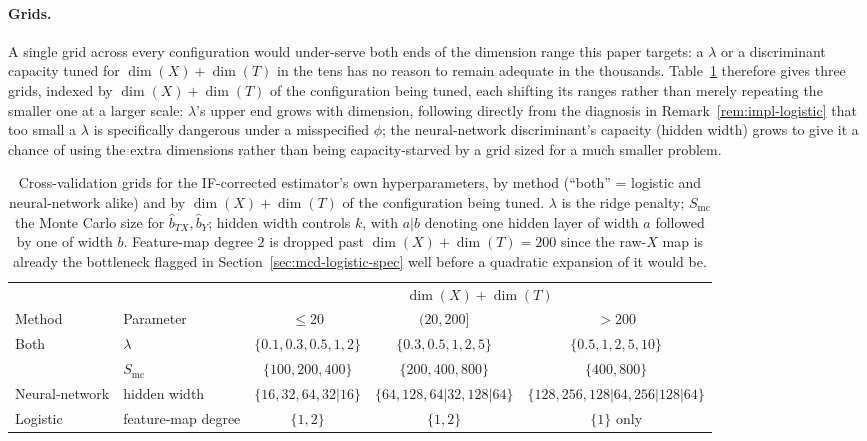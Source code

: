 \documentclass[11pt]{article}
\theoremstyle{plain}
\theoremstyle{definition}
\theoremstyle{remark}
\newcommand{\ks}{k}
\begin{document}
\paragraph{Grids.} A single grid across every configuration would under-serve both ends of the
dimension range this paper targets: a $\lambda$ or a discriminant capacity tuned for
$\dim(X)+\dim(T)$ in the tens has no reason to remain adequate in the thousands. Table~\ref{tab:cv-grids}
therefore gives three grids, indexed by $\dim(X)+\dim(T)$ of the configuration being tuned, each
shifting its ranges rather than merely repeating the smaller one at a larger scale: $\lambda$'s
upper end grows with dimension, following directly from the diagnosis in
Remark~\ref{rem:impl-logistic} that too small a $\lambda$ is specifically dangerous under a
misspecified $\phi$; the neural-network discriminant's capacity (hidden width) grows to give it
a chance of using the extra dimensions rather than being capacity-starved by a grid sized for a
much smaller problem.

\begin{table}[htbp]
\centering
\scriptsize
\begin{tabular}{@{}llccc@{}}
\toprule
& & \multicolumn{3}{c}{$\dim(X)+\dim(T)$} \\
\cmidrule(l){3-5}
Method & Parameter & $\le 20$ & $(20, 200]$ & $> 200$ \\
\midrule
\multirow{2}{*}{Both} & $\lambda$ & $\{0.1,0.3,0.5,1,2\}$ & $\{0.3,0.5,1,2,5\}$ & $\{0.5,1,2,5,10\}$ \\
 & $S_{\mathrm{mc}}$ & $\{100,200,400\}$ & $\{200,400,800\}$ & $\{400,800\}$ \\
%
%
\midrule
Neural-network & hidden width & $\{16,32,64,32|16\}$ & $\{64,128,64|32,128|64\}$ & $\{128,256,128|64,256|128|64\}$ \\
\midrule
Logistic & feature-map degree & $\{1,2\}$ & $\{1,2\}$ & $\{1\}$ only \\
\bottomrule
\end{tabular}
\caption{Cross-validation grids for the IF-corrected estimator's own hyperparameters, by method
(``both'' = logistic and neural-network alike) and by $\dim(X)+\dim(T)$
of the configuration being tuned. $\lambda$ is the ridge penalty; $S_{\mathrm{mc}}$ the Monte Carlo size for
$\widehat b_{TX},\widehat b_Y$; hidden width controls
$\ks$, with $a|b$ denoting one hidden layer of width $a$ followed by one of width $b$.
Feature-map degree $2$ is dropped past $\dim(X)+\dim(T)=200$ since the raw-$X$ map is already
the bottleneck flagged in Section~\ref{sec:mcd-logistic-spec} well before a quadratic expansion
of it would be.}
\label{tab:cv-grids}
\end{table}
\end{document}
